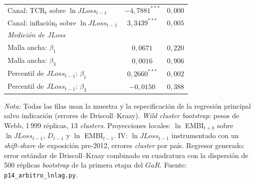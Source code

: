 \begin{table}[htbp]
\begin{tabular}{lcc}
Canal: TCR$_t$ sobre $\ln JLoss_{t-1}$ & $-4{,}7881^{***}$ & $0{,}000$ \\
Canal: inflación$_t$ sobre $\ln JLoss_{t-1}$ & $3{,}3439^{***}$ & $0{,}005$ \\
\multicolumn{3}{l}{\textit{Medición de $JLoss$}} \\
Malla ancha: $\beta_1$ & $0{,}0671$ & $0{,}220$ \\
Malla ancha: $\beta_3$ & $0{,}0016$ & $0{,}906$ \\
Percentil de $JLoss_{t-1}$: $\beta_1$ & $0{,}2660^{***}$ & $0{,}002$ \\
Percentil de $JLoss_{t-1}$: $\beta_3$ & $-0{,}0150$ & $0{,}388$ \\
\bottomrule
\end{tabular}
\par\smallskip\parbox{0.92\linewidth}{\scriptsize \textit{Nota:} Todas las filas usan la muestra y la especificación de la regresión principal salvo indicación (errores de Driscoll--Kraay). \textit{Wild cluster bootstrap}: pesos de Webb, 1\,999 réplicas, 13 \textit{clusters}. Proyecciones locales: $\ln$ EMBI$_{t+h}$ sobre $\ln JLoss_{t-1}$, $D_{t-1}$ y $\ln$ EMBI$_{t-1}$. IV: $\ln JLoss_{t-1}$ instrumentado con un \textit{shift-share} de exposición pre-2012, errores \textit{cluster} por país. Regresor generado: error estándar de Driscoll--Kraay combinado en cuadratura con la dispersión de 500 réplicas \textit{bootstrap} de la primera etapa del $GaR$. Fuente: \texttt{p14\_arbitro\_lnlag.py}.}
\end{table}
